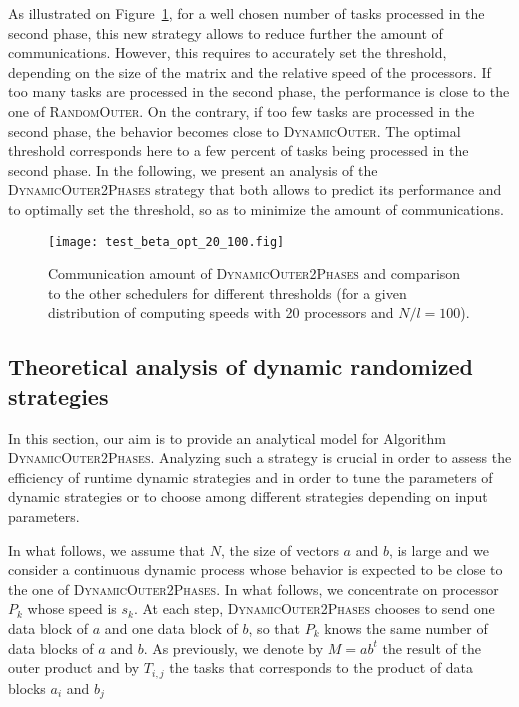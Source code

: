 \documentclass[a4paper,10pt]{article}
\newcommand{\simplerandom}{\textsc{Random\-Outer}\xspace}
\newcommand{\stupid}{\textsc{Dynamic\-Outer}\xspace}
\newcommand{\stupidthreshold}{\textsc{Dynamic\-Outer\-2Phases}\xspace}
\begin{document}
As illustrated on Figure~\ref{fig.threshold}, for a well chosen number
of tasks processed in the second phase, this new strategy allows to
reduce further the amount of communications. However, this requires to
accurately set the threshold, depending on the size of the matrix and
the relative speed of the processors. If too many tasks are processed
in the second phase, the performance is close to the one of
\simplerandom. On the contrary, if too few tasks are processed in the
second phase, the behavior becomes close to \stupid. The optimal
threshold corresponds here to a few percent of tasks being processed
in the second phase. In the following, we present an analysis of the
\stupidthreshold strategy that both allows to predict its performance
and to optimally set the threshold, so as to minimize the amount of
communications.


\begin{figure}[htbp]
  \centering
  \texttt{[image: test\_beta\_opt\_20\_100.fig]}
  \caption{Communication amount of \stupidthreshold and comparison to
    the other schedulers for different thresholds (for a given
    distribution of computing speeds with 20 processors and
    $N/l=100$).}
  \label{fig.threshold}
\end{figure}


\subsection{Theoretical analysis of dynamic randomized strategies} 
\label{outer_analysis}


In this section, our aim is to provide an analytical model for
Algorithm \stupidthreshold. Analyzing such a strategy is crucial in order to
assess the efficiency of runtime dynamic strategies and in order to
tune the parameters of dynamic strategies or to choose among different
strategies depending on input parameters.

In what follows, we assume that $N$, the size of vectors $a$ and
$b$, is large and we consider a continuous dynamic process whose
behavior is expected to be close to the one of \stupidthreshold. In what
follows, we concentrate on processor $P_k$ whose speed is $s_k$.
At each step, \stupidthreshold chooses to send one data block of $a$ and one
data block of $b$, so that $P_k$ knows the same number of data blocks
of $a$ and $b$. As previously, we denote by $M=a b^t$ the result of
the outer product and by $T_{i,j}$ the tasks that corresponds to the
product of data blocks $a_i$ and $b_j$
\end{document}
